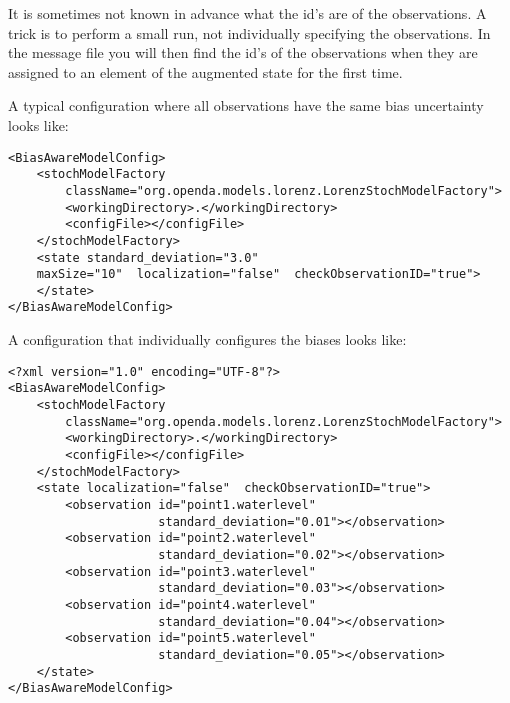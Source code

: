 It is sometimes not known in advance what the id's are of the observations. A trick is to perform a small run, not individually specifying the observations. In the message file you will then find the id's of the observations when they are assigned to an element of the augmented state for the first time.

A typical configuration where all observations have the same bias uncertainty looks like:
\begin{verbatim}
<BiasAwareModelConfig>
	<stochModelFactory
		className="org.openda.models.lorenz.LorenzStochModelFactory">
		<workingDirectory>.</workingDirectory>
		<configFile></configFile>
	</stochModelFactory>
	<state standard_deviation="3.0"
	maxSize="10"  localization="false"  checkObservationID="true">
	</state>
</BiasAwareModelConfig>
\end{verbatim}

A configuration that individually configures the biases looks like:
\begin{verbatim}
<?xml version="1.0" encoding="UTF-8"?>
<BiasAwareModelConfig>
	<stochModelFactory
		className="org.openda.models.lorenz.LorenzStochModelFactory">
		<workingDirectory>.</workingDirectory>
		<configFile></configFile>
	</stochModelFactory>
	<state localization="false"  checkObservationID="true">
		<observation id="point1.waterlevel"
		             standard_deviation="0.01"></observation>
		<observation id="point2.waterlevel" 
		             standard_deviation="0.02"></observation>
		<observation id="point3.waterlevel"
		             standard_deviation="0.03"></observation>
		<observation id="point4.waterlevel" 
		             standard_deviation="0.04"></observation>
		<observation id="point5.waterlevel" 
		             standard_deviation="0.05"></observation>
	</state>
</BiasAwareModelConfig>
\end{verbatim}

